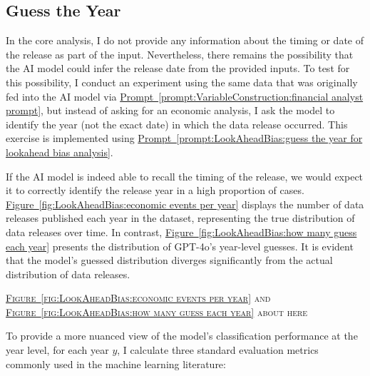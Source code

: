 \documentclass[12pt,oneside,letter]{article}
\newcommand*{\myfig}[1]{\hyperref[{#1}]{Figure~\ref*{#1}}}
\newcommand*{\myprp}[1]{\hyperref[{#1}]{Prompt~\ref*{#1}}}
\begin{document}
		\subsection{Guess the Year} 	\label{sec:Guess the Year}
		In the core analysis, I do not provide any information about the timing or date of the release as part of the input. Nevertheless, there remains the possibility that the AI model could infer the release date from the provided inputs. To test for this possibility, I conduct an experiment using the same data that was originally fed into the AI model via \myprp{prompt:VariableConstruction:financial analyst prompt}, but instead of asking for an economic analysis, I ask the model to identify the year (not the exact date) in which the data release occurred. This exercise is implemented using \myprp{prompt:LookAheadBias:guess the year for lookahead bias analysis}.
		 \begin{prompt}[H] 
		 	\centering
		 	\caption{}
		 	\label{prompt:LookAheadBias:guess the year for lookahead bias analysis}
		 \end{prompt}
		 \vspace{-20pt}If the AI model is indeed able to recall the timing of the release, we would expect it to correctly identify the release year in a high proportion of cases. \myfig{fig:LookAheadBias:economic events per year} displays the number of data releases published each year in the dataset, representing the true distribution of data releases over time. In contrast, \myfig{fig:LookAheadBias:how many guess each year} presents the distribution of GPT-4o’s year-level guesses. It is evident that the model’s guessed distribution diverges significantly from the actual distribution of data releases.
		 \begin{center}
		 	\textsc{\myfig{fig:LookAheadBias:economic events per year} and \myfig{fig:LookAheadBias:how many guess each year} about here}  
		 \end{center}
		 To provide a more nuanced view of the model’s classification performance at the year level, for each year \(y\), I calculate three standard evaluation metrics commonly used in the machine learning literature:
\end{document}
